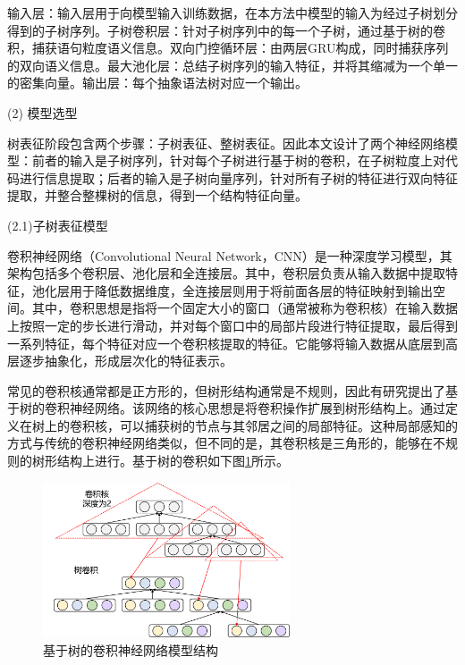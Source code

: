 输入层：输入层用于向模型输入训练数据，在本方法中模型的输入为经过子树划分得到的子树序列。子树卷积层：针对子树序列中的每一个子树，通过基于树的卷积，捕获语句粒度语义信息。双向门控循环层：由两层GRU构成，同时捕获序列的双向语义信息。最大池化层：总结子树序列的输入特征，并将其缩减为一个单一的密集向量。输出层：每个抽象语法树对应一个输出。

(2) 模型选型

树表征阶段包含两个步骤：子树表征、整树表征。因此本文设计了两个神经网络模型：前者的输入是子树序列，针对每个子树进行基于树的卷积，在子树粒度上对代码进行信息提取；后者的输入是子树向量序列，针对所有子树的特征进行双向特征提取，并整合整棵树的信息，得到一个结构特征向量。

(2.1)子树表征模型

卷积神经网络（Convolutional Neural Network，CNN）是一种深度学习模型，其架构包括多个卷积层、池化层和全连接层。其中，卷积层负责从输入数据中提取特征，池化层用于降低数据维度，全连接层则用于将前面各层的特征映射到输出空间。其中，卷积思想是指将一个固定大小的窗口（通常被称为卷积核）在输入数据上按照一定的步长进行滑动，并对每个窗口中的局部片段进行特征提取，最后得到一系列特征，每个特征对应一个卷积核提取的特征。它能够将输入数据从底层到高层逐步抽象化，形成层次化的特征表示。

常见的卷积核通常都是正方形的，但树形结构通常是不规则，因此有研究\cite{8813290}提出了基于树的卷积神经网络。该网络的核心思想是将卷积操作扩展到树形结构上。通过定义在树上的卷积核，可以捕获树的节点与其邻居之间的局部特征。这种局部感知的方式与传统的卷积神经网络类似，但不同的是，其卷积核是三角形的，能够在不规则的树形结构上进行。基于树的卷积如下图\ref{fig:TreeBaseConvolution}所示。

\begin{figure}[H]
  \centering
  \includegraphics[width=0.65\textwidth]{figures/TreeBaseConvolution.png}
  \caption{基于树的卷积神经网络模型结构}\label{fig:TreeBaseConvolution}
\end{figure}

